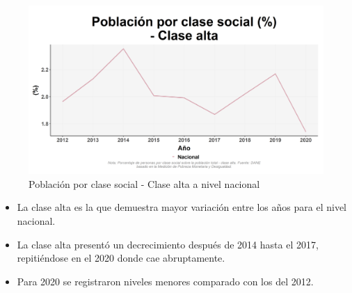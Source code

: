    \begin{figure}[H]
        \caption{Población por clase social - Clase alta a nivel nacional \label{map_result_2} }
        \begin{center}
        \includegraphics[width=\textwidth,keepaspectratio]{img/var_251_trend.png}
        \end{center}
    \end{figure}
            \begin{itemize}
                    \item La clase alta es la que demuestra mayor variación entre los años para el nivel nacional.
                    \item La clase alta presentó un decrecimiento después de 2014 hasta el 2017, repitiéndose en el 2020 donde cae abruptamente.
                    \item Para 2020 se registraron niveles menores comparado con los del 2012.
                    \end{itemize}

